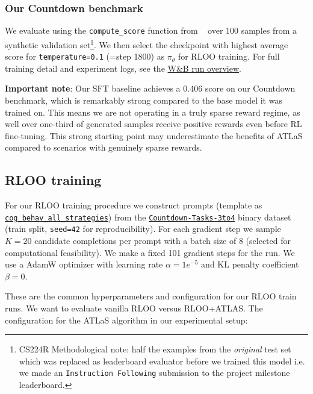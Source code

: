 \documentclass{article}
\begin{document}
\subsubsection{Our Countdown benchmark}

We evaluate using the \texttt{compute\_score} function from ~\cite{gandhi2025cognitive} over 100 samples from a synthetic validation set\footnote{CS224R Methodological note: half the examples from the \textit{original} test set which was replaced as leaderboard evaluator before we trained this model i.e. we made an \texttt{Instruction Following} submission to the project milestone leaderboard.}. We then select the checkpoint with highest average score for \texttt{temperature=0.1} (=step 1800) as $\pi_{\theta}$ for RLOO training. For full training detail and experiment logs, see the \href{https://wandb.ai/jonathanalgar/cs224r-project-sft-baseline/runs/d6osiygw/overview}{W\&B run overview}.

\textbf{Important note}: Our SFT baseline achieves a 0.406 score on our Countdown benchmark, which is remarkably strong compared to the base model it was trained on. This means we are not operating in a truly sparse reward regime, as well over one-third of generated samples receive positive rewards even before RL fine-tuning. This strong starting point may underestimate the benefits of ATLaS compared to scenarios with genuinely sparse rewards.

\subsection{RLOO training}

For our RLOO training procedure we construct prompts (template as \texttt{\href{https://huggingface.co/datasets/Asap7772/cog_behav_all_strategies}{cog\_behav\_all\_strategies}}) from the \texttt{\href{https://huggingface.co/datasets/Jiayi-Pan/Countdown-Tasks-3to4}{Countdown-Tasks-3to4}} binary dataset (train split, \texttt{seed=42} for reproducibility). For each gradient step we sample $K=20$ candidate completions per prompt with a batch size of 8 (selected for computational feasibility). We make a fixed 101 gradient steps for the run. We use a AdamW optimizer with learning rate $\alpha = 1e^{-5}$ and KL penalty coefficient $\beta = 0$.

These are the common hyperparameters and configuration for our RLOO train runs. We want to evaluate vanilla RLOO versus RLOO+ATLAS. The configuration for the ATLaS algorithm in our experimental setup: 
\end{document}
